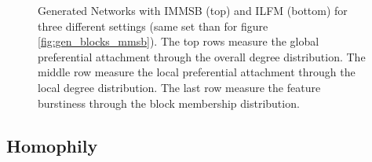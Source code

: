 \documentclass[a4paper, 12pt]{article}
\begin{document}
\begin{figure}[ht]
	\endminipage
    \caption{\tiny{Generated Networks with IMMSB (top) and ILFM (bottom) for three different settings (same set than for figure \ref{fig:gen_blocks_mmsb}). The top rows measure the global preferential attachment through the overall degree distribution. The middle row measure the local preferential attachment through the local degree distribution. The last row measure the feature burstiness through the block membership distribution.}}
	\label{fig:gen_burst}
\end{figure}


\subsection{Homophily}
\end{document}
